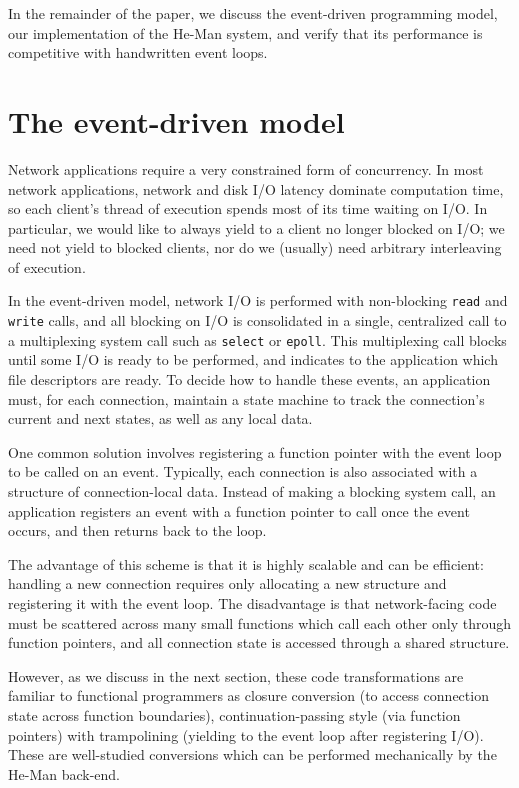 \documentclass[preprint]{sigplanconf}
\renewcommand{\t}{\texttt}
\begin{document}
In the remainder of the paper, we discuss the event-driven programming model,
our implementation of the He-Man system, and verify that its performance is
competitive with handwritten event loops.

\section{The event-driven model}

Network applications require a very constrained form of
concurrency. In most network applications, network and disk
I/O latency dominate computation time, so each client's thread
of execution spends most of its time waiting on I/O. In particular, we
would like to always yield to a client no longer blocked on I/O; we
need not yield to blocked clients, nor do we (usually) need arbitrary
interleaving of execution.

In the event-driven model, network I/O is performed with non-blocking
\t{read} and \t{write} calls, and all blocking on I/O is consolidated
in a single, centralized call to a multiplexing system call such as
\t{select} or \t{epoll}. This multiplexing call blocks until some 
I/O is ready to be performed, and indicates to the application
which file descriptors are ready. To decide how to handle these 
events, an application must, for each connection, maintain a
state machine to track the connection's current and next states, as 
well as any local data.

One common solution involves registering a function
pointer with the event loop to be called on an event. Typically, each
connection is also associated with a structure of connection-local
data. Instead of making a blocking system call, an application
registers an event with a function pointer to call once the event 
occurs, and then returns back to the loop.

The advantage of this scheme is that it is highly scalable and can be
efficient: handling a new connection requires only allocating a new 
structure and registering it with the event loop. The disadvantage is 
that network-facing code must be scattered across many small functions 
which call each other only through function pointers, and all connection 
state is accessed through a shared structure.

However, as we discuss in the next section, these code transformations are
familiar to functional programmers as closure conversion (to access connection
state across function boundaries), continuation-passing style (via function
pointers) with trampolining (yielding to the event loop after registering I/O).
These are well-studied conversions which can be performed mechanically by the
He-Man back-end.
\end{document}

